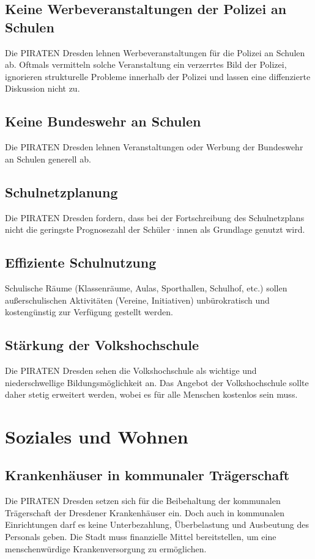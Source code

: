\documentclass[a4paper, 11pt]{article}
\begin{document}
\subsection{Keine Werbeveranstaltungen der Polizei an Schulen}
Die PIRATEN Dresden lehnen Werbeveranstaltungen für die Polizei an Schulen ab. Oftmals vermitteln solche Veranstaltung ein verzerrtes Bild der Polizei, ignorieren strukturelle Probleme innerhalb der Polizei und lassen eine diffenzierte Diskussion nicht zu.


\subsection{Keine Bundeswehr an Schulen}
Die PIRATEN Dresden lehnen Veranstaltungen oder Werbung der Bundeswehr an Schulen generell ab.


\subsection{Schulnetzplanung}
Die PIRATEN Dresden fordern, dass bei der Fortschreibung des Schulnetzplans nicht die geringste Prognosezahl der Schüler·innen als Grundlage genutzt wird.



\subsection{Effiziente Schulnutzung}
Schulische Räume (Klassenräume, Aulas, Sporthallen, Schulhof, etc.) sollen außerschulischen Aktivitäten (Vereine, Initiativen) unbürokratisch und kostengünstig zur Verfügung gestellt werden.


\subsection{Stärkung der Volkshochschule}
Die PIRATEN Dresden sehen die Volkshochschule als wichtige und niederschwellige Bildungsmöglichkeit an. Das Angebot der Volkshochschule sollte daher stetig erweitert werden, wobei es für alle Menschen kostenlos sein muss.


\section{Soziales und Wohnen}

\subsection{Krankenhäuser in kommunaler Trägerschaft}
Die PIRATEN Dresden setzen sich für die Beibehaltung der kommunalen Trägerschaft der Dresdener Krankenhäuser ein. Doch auch in kommunalen Einrichtungen darf es keine Unterbezahlung, Überbelastung und Ausbeutung des Personals geben. Die Stadt muss finanzielle Mittel bereitstellen, um eine menschenwürdige Krankenversorgung zu ermöglichen.
\end{document}
